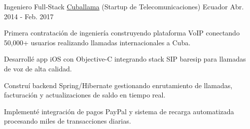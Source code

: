 \begin{cventries}
  \cventry
    {Ingeniero Full-Stack} %
    {\href{https://www.cuballama.com/}{Cuballama} (Startup de Telecomunicaciones)} %
    {Ecuador} %
    {Abr. 2014 - Feb. 2017} %
    {
      \begin{cvitems} %
        \item {Primera contratación de ingeniería construyendo plataforma VoIP conectando 50,000+ usuarios realizando llamadas internacionales a Cuba.}
        \item {Desarrollé app iOS con Objective-C integrando stack SIP baresip para llamadas de voz de alta calidad.}
        \item {Construí backend Spring/Hibernate gestionando enrutamiento de llamadas, facturación y actualizaciones de saldo en tiempo real.}
        \item {Implementé integración de pagos PayPal y sistema de recarga automatizada procesando miles de transacciones diarias.}
      \end{cvitems}
    }

\end{cventries}
